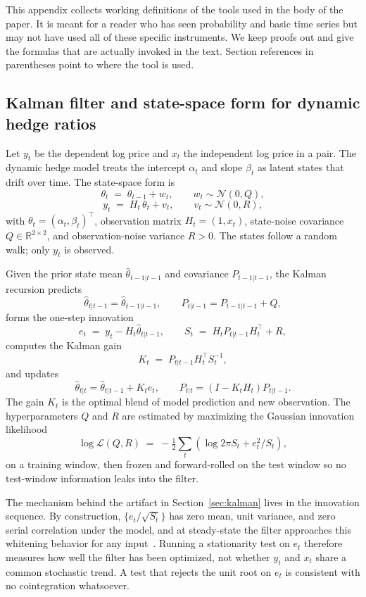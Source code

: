 \documentclass[11pt]{article}
\begin{document}
This appendix collects working definitions of the tools used in the body of the paper. It
is meant for a reader who has seen probability and basic time series but may not have used
all of these specific instruments. We keep proofs out and give the formulas that are
actually invoked in the text. Section references in parentheses point to where the tool is
used.

\subsection{Kalman filter and state-space form for dynamic hedge ratios}
\label{app:kalman}

Let $y_t$ be the dependent log price and $x_t$ the independent log price in a pair. The
dynamic hedge model treats the intercept $\alpha_t$ and slope $\beta_t$ as latent states
that drift over time. The state-space form is
\[
\theta_t \;=\; \theta_{t-1} + w_t, \qquad w_t \sim \mathcal{N}(0, Q),
\]
\[
y_t \;=\; H_t \, \theta_t + v_t, \qquad v_t \sim \mathcal{N}(0, R),
\]
with $\theta_t = (\alpha_t, \beta_t)^\top$, observation matrix $H_t = (1, x_t)$, state-noise
covariance $Q \in \mathbb{R}^{2\times 2}$, and observation-noise variance $R > 0$. The
states follow a random walk; only $y_t$ is observed.

Given the prior state mean $\hat{\theta}_{t-1|t-1}$ and covariance $P_{t-1|t-1}$, the
Kalman recursion predicts
\[
\hat{\theta}_{t|t-1} = \hat{\theta}_{t-1|t-1}, \qquad P_{t|t-1} = P_{t-1|t-1} + Q,
\]
forms the one-step innovation
\[
e_t \;=\; y_t - H_t \hat{\theta}_{t|t-1}, \qquad S_t \;=\; H_t P_{t|t-1} H_t^\top + R,
\]
computes the Kalman gain
\[
K_t \;=\; P_{t|t-1} H_t^\top S_t^{-1},
\]
and updates
\[
\hat{\theta}_{t|t} = \hat{\theta}_{t|t-1} + K_t e_t, \qquad P_{t|t} = (I - K_t H_t) P_{t|t-1}.
\]
The gain $K_t$ is the optimal blend of model prediction and new observation. The
hyperparameters $Q$ and $R$ are estimated by maximizing the Gaussian innovation likelihood
\[
\log \mathcal{L}(Q, R) \;=\; -\tfrac{1}{2} \sum_{t} \left( \log 2\pi S_t + e_t^2 / S_t \right),
\]
on a training window, then frozen and forward-rolled on the test window so no test-window
information leaks into the filter.

The mechanism behind the artifact in Section~\ref{sec:kalman} lives in the innovation
sequence. By construction, $\{e_t / \sqrt{S_t}\}$ has zero mean, unit variance, and zero
serial correlation under the model, and at steady-state the filter approaches this
whitening behavior for any input~\cite{harvey1989structural}. Running a stationarity test
on $e_t$ therefore measures how well the filter has been optimized, not whether $y_t$ and
$x_t$ share a common stochastic trend. A test that rejects the unit root on $e_t$ is
consistent with no cointegration whatsoever.
\end{document}
